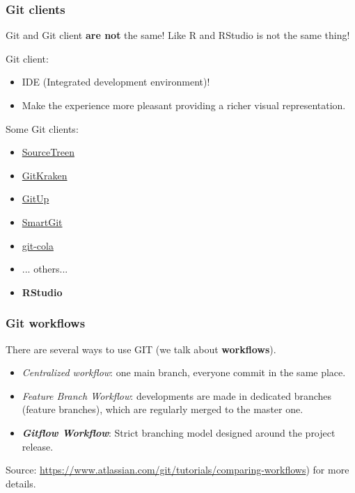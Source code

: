 \documentclass{beamer}
\begin{document}
\begin{frame}
\frametitle{Git clients}

Git and Git client \textbf{are not} the same! Like R and RStudio is not the same thing!
\hfill \break

Git client:
\begin{itemize}
    \item IDE (Integrated development environment)!
    \item Make the experience more pleasant providing a richer visual representation.
\end{itemize}

\hfill 

Some Git clients:
\begin{itemize}
    \item \href{https://www.sourcetreeapp.com/}{\faStar SourceTreen} 
    \item \href{https://www.gitkraken.com/}{\faStar GitKraken}
    \item \href{https://gitup.co/}{\faStar GitUp} 
    \item \href{https://www.syntevo.com/smartgit/}{\faStar SmartGit} 
    \item \href{https://git-cola.github.io/}{\faStar git-cola} 
    \item ... others... 
    \item \textbf{RStudio} 
\end{itemize}
\end{frame}


\begin{frame}
\frametitle{Git workflows} %
There are several ways to use GIT (we talk about \textbf{workflows}). 

\begin{itemize}
    \item \emph{Centralized workflow}: one main branch, everyone commit in the same place.
    \item \emph{Feature Branch Workflow}: developments are made in dedicated branches (feature branches), which are regularly merged to the master one.
    \item \textbf{\textit{Gitflow Workflow}}: Strict branching model designed around the project release.
\end{itemize}

Source: \url{https://www.atlassian.com/git/tutorials/comparing-workflows}) for more details.

\end{frame}
\end{document}
